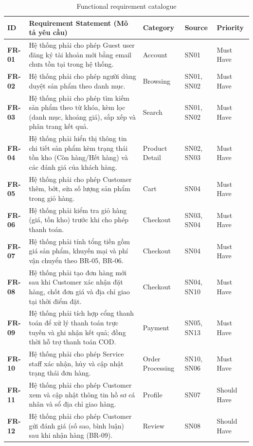 \documentclass[12pt,a4paper,oneside]{report}
\begin{document}
\begin{longtable}{p{1.6cm}p{7.4cm}p{2.9cm}p{1.9cm}p{2.2cm}}
\caption{Functional requirement catalogue}\\
\toprule
\textbf{ID} & \textbf{Requirement Statement (Mô tả yêu cầu)} & \textbf{Category} & \textbf{Source} & \textbf{Priority} \\
\midrule
\endhead
\bottomrule
\endlastfoot
\textbf{FR-01} & Hệ thống phải cho phép Guest user đăng ký tài khoản mới bằng email chưa tồn tại trong hệ thống. & Account & SN01 & Must Have \\
\textbf{FR-02} & Hệ thống phải cho phép người dùng duyệt sản phẩm theo danh mục. & Browsing & SN01, SN02 & Must Have \\
\textbf{FR-03} & Hệ thống phải cho phép tìm kiếm sản phẩm theo từ khóa, kèm lọc (danh mục, khoảng giá), sắp xếp và phân trang kết quả. & Search & SN01, SN02 & Must Have \\
\textbf{FR-04} & Hệ thống phải hiển thị thông tin chi tiết sản phẩm kèm trạng thái tồn kho (Còn hàng/Hết hàng) và các đánh giá của khách hàng. & Product Detail & SN02, SN03 & Must Have \\
\textbf{FR-05} & Hệ thống phải cho phép Customer thêm, bớt, sửa số lượng sản phẩm trong giỏ hàng. & Cart & SN04 & Must Have \\
\textbf{FR-06} & Hệ thống phải kiểm tra giỏ hàng (giá, tồn kho) trước khi cho phép thanh toán. & Checkout & SN03, SN04 & Must Have \\
\textbf{FR-07} & Hệ thống phải tính tổng tiền gồm giá sản phẩm, khuyến mại và phí vận chuyển theo BR-05, BR-06. & Checkout & SN04 & Must Have \\
\textbf{FR-08} & Hệ thống phải tạo đơn hàng mới sau khi Customer xác nhận đặt hàng, chốt đơn giá và địa chỉ giao tại thời điểm đặt. & Checkout & SN04, SN10 & Must Have \\
\textbf{FR-09} & Hệ thống phải tích hợp cổng thanh toán để xử lý thanh toán trực tuyến và ghi nhận kết quả; đồng thời hỗ trợ thanh toán COD. & Payment & SN05, SN13 & Must Have \\
\textbf{FR-10} & Hệ thống phải cho phép Service staff xác nhận, hủy và cập nhật trạng thái đơn hàng. & Order Processing & SN10, SN06 & Must Have \\
\textbf{FR-11} & Hệ thống phải cho phép Customer xem và cập nhật thông tin hồ sơ cá nhân và sổ địa chỉ giao hàng. & Profile & SN07 & Should Have \\
\textbf{FR-12} & Hệ thống phải cho phép Customer gửi đánh giá (số sao, bình luận) sau khi nhận hàng (BR-09). & Review & SN08 & Should Have \\

\end{longtable}
\end{document}
